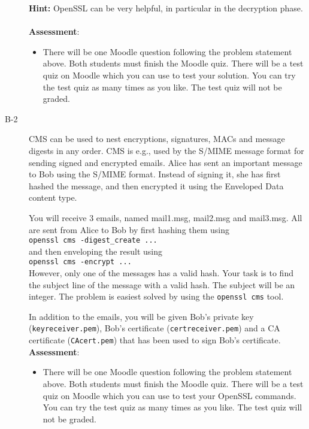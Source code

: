 \documentclass{article}
\begin{document}
\begin{description}
{			\textbf{Hint:} OpenSSL can be very helpful, in particular in the decryption phase.\\\\
			
			\textbf{Assessment}:
			\begin{itemize}
				\item There will be one Moodle question following the problem statement above. Both students must finish the Moodle quiz.
				There will be a test quiz on Moodle which you can use to test your solution. You can try the test quiz as many times as you like. The test quiz will not be graded.
			\end{itemize}
		}
		
		\item[B-2]{CMS can be used to nest encryptions, signatures, MACs and message digests in any order. CMS is e.g., used by the S/MIME message format for sending signed and encrypted emails. Alice has sent an important message to Bob using the S/MIME format. Instead of signing it, she has first hashed the message, and then encrypted it using the Enveloped Data content type.
			
			You will receive 3 emails, named mail1.msg, mail2.msg and mail3.msg. All are sent from Alice to Bob by first hashing them using \\ \texttt{openssl cms -digest\_create ...}\\ and then enveloping the result using \\\texttt{openssl cms -encrypt ...}\\However, only one of the messages has a valid hash. Your task is to find the subject line of the message with a valid hash. The subject will be an integer. The problem is easiest solved by using the \texttt{openssl cms} tool.
			
			In addition to the emails, you will be given Bob's private key (\texttt{keyreceiver.pem}), Bob's certificate (\texttt{certreceiver.pem}) and a CA certificate (\texttt{CAcert.pem}) that has been used to sign Bob's certificate.\\
			\textbf{Assessment}:
			\begin{itemize}
				\item There will be one Moodle question following the problem statement above. Both students must finish the Moodle quiz.
				There will be a test quiz on Moodle which you can use to test your OpenSSL commands. You can try the test quiz as many times as you like. The test quiz will not be graded.
			\end{itemize}}
			

\end{description}
\end{document}
